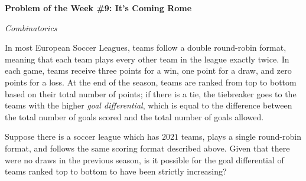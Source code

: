 \begin{potw}\vspace{5pt}
{\large\textbf{Problem of the Week \#9: It's Coming Rome}}\vspace{5pt}

\textit{Combinatorics}\V

In most European Soccer Leagues, teams follow a double round-robin format, meaning that each team plays every other team in the league exactly twice. In each game, teams receive three points for a win, one point for a draw, and zero points for a loss. At the end of the season, teams are ranked from top to bottom based on their total number of points; if there is a tie, the tiebreaker goes to the teams with the higher \textit{goal differential}, which is equal to the difference between the total number of goals scored and the total number of goals allowed.\V

Suppose there is a soccer league which has $2021$ teams, plays a single round-robin format, and follows the same scoring format described above. Given that there were no draws in the previous season, is it possible for the goal differential of teams ranked top to bottom to have been strictly increasing?
\end{potw}\V
